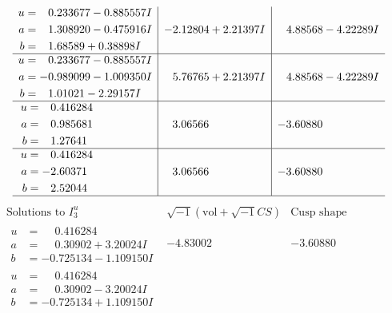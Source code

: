 \documentclass[1p]{elsarticle_modified}
\theoremstyle{definition}
\newcommand{\I}{\sqrt{-1}}
\begin{document}
$$\begin{array}{c|c|c}
\begin{aligned}
u &= \phantom{-}0.233677 - 0.885557 I \\
a &= \phantom{-}1.308920 - 0.475916 I \\
b &= \phantom{-}1.68589 + 0.38898 I\end{aligned}
 & -2.12804 + 2.21397 I & \phantom{-}4.88568 - 4.22289 I \\ \hline\begin{aligned}
u &= \phantom{-}0.233677 - 0.885557 I \\
a &= -0.989099 - 1.009350 I \\
b &= \phantom{-}1.01021 - 2.29157 I\end{aligned}
 & \phantom{-}5.76765 + 2.21397 I & \phantom{-}4.88568 - 4.22289 I \\ \hline\begin{aligned}
u &= \phantom{-}0.416284\phantom{ +0.000000I} \\
a &= \phantom{-}0.985681\phantom{ +0.000000I} \\
b &= \phantom{-}1.27641\phantom{ +0.000000I}\end{aligned}
 & \phantom{-}3.06566\phantom{ +0.000000I} & -3.60880\phantom{ +0.000000I} \\ \hline\begin{aligned}
u &= \phantom{-}0.416284\phantom{ +0.000000I} \\
a &= -2.60371\phantom{ +0.000000I} \\
b &= \phantom{-}2.52044\phantom{ +0.000000I}\end{aligned}
 & \phantom{-}3.06566\phantom{ +0.000000I} & -3.60880\phantom{ +0.000000I}\\
 \hline 
 \end{array}$$\newpage$$\begin{array}{c|c|c}  
\text{Solutions to }I^u_{3}& \I (\text{vol} + \sqrt{-1}CS) & \text{Cusp shape}\\
 \hline 
\begin{aligned}
u &= \phantom{-}0.416284\phantom{ +0.000000I} \\
a &= \phantom{-}0.30902 + 3.20024 I \\
b &= -0.725134 - 1.109150 I\end{aligned}
 & -4.83002\phantom{ +0.000000I} & -3.60880\phantom{ +0.000000I} \\ \hline\begin{aligned}
u &= \phantom{-}0.416284\phantom{ +0.000000I} \\
a &= \phantom{-}0.30902 - 3.20024 I \\
b &= -0.725134 + 1.109150 I\end{aligned}

\end{array}$$
\end{document}
